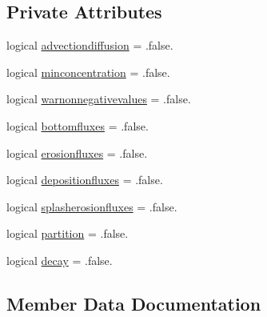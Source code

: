 \subsection*{Private Attributes}
\begin{DoxyCompactItemize}
\item 
logical \mbox{\hyperlink{structmodulerunoffproperties_1_1t__coupled_aa37b8440cd8aa037da14f4bf1518cefa}{advectiondiffusion}} = .false.
\item 
logical \mbox{\hyperlink{structmodulerunoffproperties_1_1t__coupled_abd0e004ebd1008da4031056da5b6de28}{minconcentration}} = .false.
\item 
logical \mbox{\hyperlink{structmodulerunoffproperties_1_1t__coupled_a2749ce15c9e48ba97ed463e356c63b75}{warnonnegativevalues}} = .false.
\item 
logical \mbox{\hyperlink{structmodulerunoffproperties_1_1t__coupled_a94eab95ea328bfc10bf3ffae3bed8102}{bottomfluxes}} = .false.
\item 
logical \mbox{\hyperlink{structmodulerunoffproperties_1_1t__coupled_adf2e8d81649092f9ed6fa4d147903385}{erosionfluxes}} = .false.
\item 
logical \mbox{\hyperlink{structmodulerunoffproperties_1_1t__coupled_af66b3522e946f33d274d92836bbced8a}{depositionfluxes}} = .false.
\item 
logical \mbox{\hyperlink{structmodulerunoffproperties_1_1t__coupled_aa17d1fe56027736166eb8cf943b8de11}{splasherosionfluxes}} = .false.
\item 
logical \mbox{\hyperlink{structmodulerunoffproperties_1_1t__coupled_ab9d6879b155f1bf6ae0a10bd06906e01}{partition}} = .false.
\item 
logical \mbox{\hyperlink{structmodulerunoffproperties_1_1t__coupled_ad11196790361f4acd36d49e71851f369}{decay}} = .false.
\end{DoxyCompactItemize}


\subsection{Member Data Documentation}
\mbox{\label{structmodulerunoffproperties_1_1t__coupled_aa37b8440cd8aa037da14f4bf1518cefa}} 
